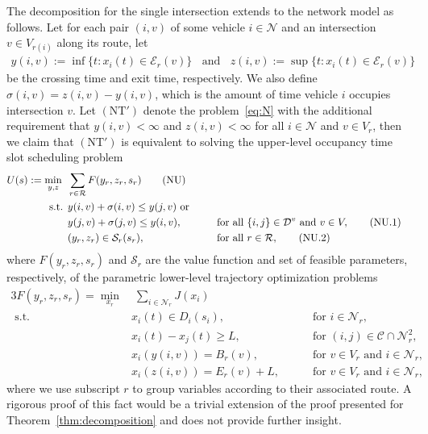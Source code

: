 \documentclass[a4paper]{report}
\theoremstyle{definition}
\theoremstyle{plain}
\begin{document}
The decomposition for the single intersection extends to the
network model as follows. Let for each pair $(i,v)$ of some vehicle
$i \in \mathcal{N}$ and an intersection $v \in V_{r(i)}$ along its route, let
\begin{align*}
y(i, v) := \inf \{ t: x_{i}(t) \in \mathcal{E}_{r}(v) \} \;\; \text{ and } \;\;  z(i, v) := \sup \{ t: x_{i}(t) \in \mathcal{E}_{r}(v) \}
\end{align*}
be the crossing time and exit time, respectively. We also define $\sigma(i, v) = z(i, v) - y(i, v)$, which
is the amount of time vehicle $i$ occupies intersection $v$.
%
Let $(\mathrm{NT}')$ denote the problem~\eqref{eq:N} with the additional
requirement that $y(i,v) < \infty$ and $z(i, v) < \infty$ for all
$i \in \mathcal{N}$ and $v \in V_r$, then we claim that $(\mathrm{NT}')$ is
equivalent to solving the upper-level occupancy time slot scheduling problem
\begin{alignat}{3}
  U(s) := \min_{y,z} \;\; & \sum_{r \in \mathcal{R}} F(y_{r}, z_{r}, s_r) \tag{NU} \\
  \text{ s.t. } & y(i,v) + \sigma(i,v) \leq y(j,v) \text{ or } \notag \\
                & y(j,v) + \sigma(j,v) \leq y(i,v) , && \quad \text{ for all } \{i,j\} \in \mathcal{D}^{v} \text{ and } v \in V, \tag{NU.1} \\
  & (y_{r}, z_{r}) \in \mathcal{S}_{r}(s_r) , &&  \quad \text{ for all } r \in \mathcal{R} , \tag{NU.2}
\end{alignat}
%
where $F(y_{r}, z_{r}, s_r)$ and $\mathcal{S}_{r}$ are the value function and
set of feasible parameters, respectively, of the parametric lower-level
trajectory optimization problems
%
\begin{alignat}{3}
  F(y_{r}, z_{r}, s_r) = \min_{x_{r}} & \; \sum_{i \in \mathcal{N}_{r}} J(x_{i}) \tag{NL} \\
  \text{ s.t. } & x_{i}(t) \in D_{i}(s_{i}) , && \quad \text{ for } i \in \mathcal{N}_{r} , \tag{NL.1} \\
  & x_{i}(t) - x_{j}(t) \geq L , && \quad \text{ for } (i, j) \in \mathcal{C} \cap \mathcal{N}^2_{r} , \tag{NL.2} \\
  & x_{i}(y(i,v)) = B_{r}(v) , && \quad \text{ for } v \in V_{r} \text{ and } i \in \mathcal{N}_{r} , \tag{NL.3} \\
  & x_{i}(z(i,v)) = E_{r}(v) + L , && \quad \text{ for } v \in V_{r} \text{ and } i \in \mathcal{N}_{r} , \tag{NL.4}
\end{alignat}
where we use subscript $r$ to group variables according to their associated route.
%
A rigorous proof of this fact would be a trivial extension of the proof
presented for Theorem~\ref{thm:decomposition} and does not provide further
insight.
\end{document}
